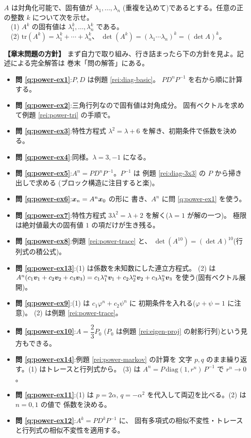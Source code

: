 \begin{mondai}[証明]\label{q:power-ex12}
$A$ は対角化可能で、固有値が $\lambda_1, \dots, \lambda_n$
(重複を込めて)であるとする。任意の正の整数 $k$ について次を示せ。\\
　(1) $A^k$ の固有値は $\lambda_1^k, \dots, \lambda_n^k$ である。\\
　(2) $\mathrm{tr}(A^k) = \lambda_1^k + \cdots + \lambda_n^k$、
$\det(A^k) = (\lambda_1 \cdots \lambda_n)^k = (\det A)^k$。
\end{mondai}

\bigskip
{\small
\noindent\textbf{【章末問題の方針】}\quad
まず自力で取り組み、行き詰まったら下の方針を見よ。記述による完全解答は
巻末「問の解答」にある。
\begin{itemize}
\item \textbf{問 \ref{q:power-ex1}}:$P, D$ は例題 \ref{rei:diag-basic}。
$PD^nP^{-1}$ を右から順に計算する。
\item \textbf{問 \ref{q:power-ex2}}:三角行列なので固有値は対角成分。
固有ベクトルを求めて例題 \ref{rei:power-tri} の手順で。
\item \textbf{問 \ref{q:power-ex3}}:特性方程式
$\lambda^2 = \lambda + 6$ を解き、初期条件で係数を決める。
\item \textbf{問 \ref{q:power-ex4}}:同様。$\lambda = 3, -1$ になる。
\item \textbf{問 \ref{q:power-ex5}}:$A^n = PD^nP^{-1}$。$P^{-1}$ は
例題 \ref{rei:diag-3x3} の $P$ から掃き出しで求める
(ブロック構造に注目すると楽)。
\item \textbf{問 \ref{q:power-ex6}}:$\bm{x}_n = A^n\bm{x}_0$ の形に
書き、$A^n$ に問 \ref{q:power-ex1} を使う。
\item \textbf{問 \ref{q:power-ex7}}:特性方程式
$3\lambda^2 = \lambda + 2$ を解く($\lambda = 1$ が解の一つ)。
極限は絶対値最大の固有値 $1$ の項だけが生き残る。
\item \textbf{問 \ref{q:power-ex8}}:例題 \ref{rei:power-trace} と、
$\det(A^{10}) = (\det A)^{10}$(行列式の積公式)。
\item \textbf{問 \ref{q:power-ex13}}:(1) は係数を未知数にした連立方程式。
(2) は $A^n(c_1\bm{v}_1 + c_2\bm{v}_2 + c_3\bm{v}_3)
= c_1\lambda_1^n\bm{v}_1 + c_2\lambda_2^n\bm{v}_2
+ c_3\lambda_3^n\bm{v}_3$ を使う(固有ベクトル展開)。
\item \textbf{問 \ref{q:power-ex9}}:(1) は $c_1\varphi^n + c_2\psi^n$ に
初期条件を入れる($\varphi + \psi = 1$ に注意)。
(2) は例題 \ref{rei:power-trace}。
\item \textbf{問 \ref{q:power-ex10}}:$A = \dfrac{2}{3} P_0$
($P_0$ は例題 \ref{rei:eigen-proj} の射影行列)という見方もできる。
\item \textbf{問 \ref{q:power-ex14}}:例題 \ref{rei:power-markov} の計算を
文字 $p, q$ のまま繰り返す。(1) はトレースと行列式から。
(3) は $A^n = P\,\mathrm{diag}(1, r^n)\,P^{-1}$ で $r^n \to 0$。
\item \textbf{問 \ref{q:power-ex11}}:(1) は $p = 2\alpha$,
$q = -\alpha^2$ を代入して両辺を比べる。(2) は $n = 0, 1$ の値で
係数を決める。
\item \textbf{問 \ref{q:power-ex12}}:$A^k = PD^kP^{-1}$ に、
固有多項式の相似不変性・トレースと行列式の相似不変性を適用する。
\end{itemize}
}

